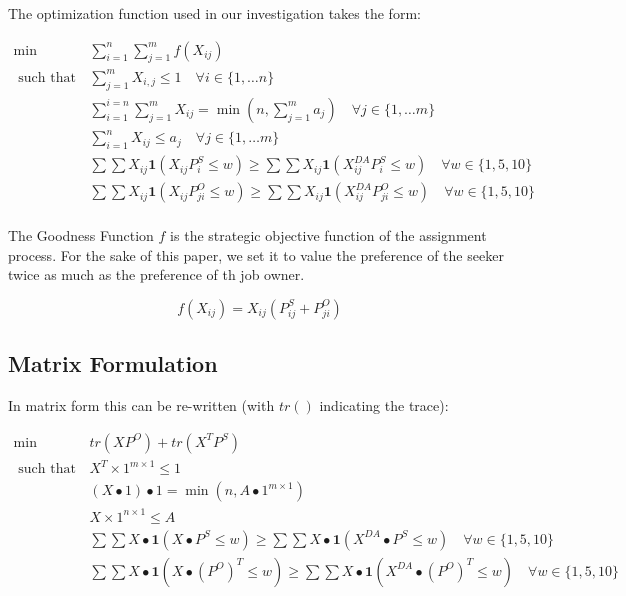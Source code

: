 
The optimization function used in our investigation takes the form:

\begin{align}
\min \qquad & \sum_{i = 1}^{n} \sum_{j = 1}^{m} f(X_{ij}) \label{obj_func}\\
\text{ such that } \qquad & \sum_{j=1}^m X_{i,j} \leq 1 \quad  \forall i \in \{1, \dots n\} \label{one_job}\\
& \sum_{i = 1}^{i=n} \sum_{j = 1}^{m}X_{ij} = \min \left(n,\sum_{j = 1}^{m}a_j \right) \quad  \forall j \in \{1, \dots m\}  \label{all_filled}\\
& \sum_{i=1}^n X_{ij} \leq a_j \quad  \forall j \in \{1, \dots m\} \label{capacity} \\
& \sum \sum X_{ij}\mathbf{1}(X_{ij} P^S_{i} \leq w) \geq \sum \sum X_{ij}\mathbf{1}(X^{DA}_{ij} P^S_{i} \leq w) \quad \forall w \in \{1,5,10\} \\ \label{s_da}
& \sum \sum X_{ij}\mathbf{1}(X_{ij} P^O_{ji} \leq w) \geq \sum \sum X_{ij}\mathbf{1}(X^{DA}_{ij} P^O_{ji} \leq w) \quad \forall w \in \{1,5,10\} \\ \label{o_da}
\end{align}

The Goodness Function $f$ is the strategic objective function of the assignment process. For the sake of this paper, we set it to value the preference of the seeker twice as much as the preference of th job owner.

\[f(X_{ij}) = X_{ij}(P^S_{ij} + P^O_{ji})\]

\subsection{Matrix Formulation}

In matrix form this can be re-written (with $tr()$ indicating the trace):

\begin{align}
\min \qquad & tr(XP^O) + tr(X^TP^S) \label{mat_obj_func} \\
\text{ such that } \qquad & X^T \times 1^{m \times 1}  \leq 1  \label{one_job_matrix}\\
& (X \bullet 1)\bullet 1 = \min(n,A \bullet 1^{m \times 1}) \label{all_filled_matrix}\\
& X \times 1^{n \times 1} \leq A \label{capacity_matrix} \\
& \sum \sum X \bullet\mathbf{1}(X \bullet P^S \leq w) \geq \sum \sum X \bullet\mathbf{1}(X^{DA} \bullet P^S \leq w) \quad \forall w \in \{1,5,10\} \\ \label{mat_s_da}
& \sum \sum X \bullet\mathbf{1}(X \bullet (P^O)^T \leq w) \geq \sum \sum X \bullet\mathbf{1}(X^{DA} \bullet (P^O)^T \leq w) \quad \forall w \in \{1,5,10\} \\ \label{mat_o_da}
\end{align}

